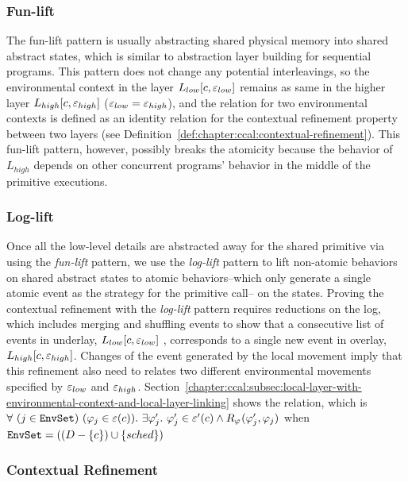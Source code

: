 \subsubsection{Fun-lift}
The fun-lift pattern is usually abstracting shared physical memory into shared abstract states,
which is similar to  abstraction layer building for sequential programs.
This pattern does not change any potential interleavings, 
so the environmental context in the layer $L_{low}[c, {\varepsilon}_{low}]$ remains 
as same in the higher layer $L_{high}[c, {\varepsilon}_{high}]$ (${\varepsilon}_{low} = {\varepsilon}_{high}$), and the 
relation for two environmental contexts is defined as an identity relation 
for the contextual refinement property between two layers (see Definition~\ref{def:chapter:ccal:contextual-refinement}).
This fun-lift pattern, however, possibly breaks the atomicity because the behavior of $L_{high}$ depends on other concurrent programs’ behavior in the middle of the primitive executions. 

\subsubsection{Log-lift}

Once all the low-level details are abstracted away for the shared primitive via using the \textit{fun-lift} pattern, we use the \textit{log-lift} pattern to lift non-atomic behaviors on shared abstract states to atomic behaviors--which only generate a single atomic event as the strategy for the primitive call-- on the states. 
Proving the contextual refinement with the \textit{log-lift} pattern requires reductions on the log, 
which includes merging and shuffling events to show 
that a consecutive list of  events in underlay, $L_{low}[c, {\varepsilon}_{low}]$ , corresponds to a single new event in overlay, 
$L_{high}[c, {\varepsilon}_{high}]$.  Changes of the event generated by the local movement 
imply that this refinement also need to relates two different environmental movements specified by ${\varepsilon}_{low}$ and ${\varepsilon}_{high}$.
Section~\ref{chapter:ccal:subsec:local-layer-with-environmental-context-and-local-layer-linking} shows the relation,
which is $\forall\ (j \in \codeinmath{EnvSet})\ 
(\strat{j} \in \oracle(c)) .\ \exists \stratp{j} . \ \stratp{j} \in \oracle'(c) \wedge R_{\strat{}}(\stratp{j}, \strat{j})$ when 
${\mathrm{\texttt{EnvSet}}} = ((D - \{ c\}) \cup \{ sched\})$


\subsubsection{Contextual Refinement}

